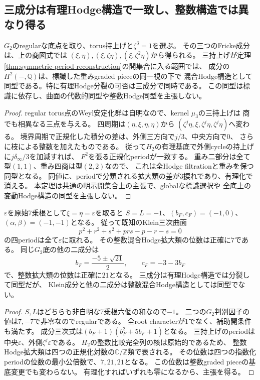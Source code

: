 \subsection{三成分は有理Hodge構造で一致し、整数構造では異なり得る}
\begin{theorem}[三乗根の差と有理混合Hodge構造]
\label{thm:G2-companion-rational-Hodge}
$G_2$のregularな底点を取り、torus持上げと$\zeta^3=1$を選ぶ。
その三つのFricke成分は、上の商図式では
$(\xi,\eta),(\xi,\zeta\eta),(\xi,\zeta^2\eta)$から得られる。
三持上げが定理\ref{thm:symmetric-period-reconstruction}の開集合に入る範囲では、
成分の$H^2(-,\mathbb Q)$は、標識した重みgraded pieceの同一視の下で
混合Hodge構造として同型である。特に有理Hodge分裂の可否は三成分で同時である。
この同型は標識に依存し、曲面の代数的同型や整数Hodge同型を主張しない。
\end{theorem}
\begin{proof}
regular torus点のWeyl安定化群は自明なので、kernel $\mu_3$の三持上げは
商でも相異なる三点を与える。
四周期は$(\eta,\xi,\eta,\eta)$から
$(\zeta^j\eta,\xi,\zeta^j\eta,\zeta^j\eta)$へ変わる。
境界周期で正規化した積分の差は、外側三方向で$j/3$、中央方向で$0$、
さらに枝による整数を加えたものである。
従って$H_2$の有理基底で外側cycleの持上げに$j\delta_\infty/3$を加減すれば、
$F^2$を張る正規化periodが一致する。
重み二部分は全て型$(1,1)$、重み四商は型$(2,2)$なので、
これは全Hodge filtrationと重みを保つ同型となる。
同値に、periodで分類される拡大類の差が3捩れであり、有理化で消える。
本定理は共通の明示開集合上の主張で、globalな標識選択や
全底上の変動Hodge構造の同型を主張しない。
\end{proof}

\begin{corollary}
\label{cor:Klein-seven-twentyone-Hodge}
$\varepsilon$を原始7乗根として$\xi=\eta=\varepsilon$を取ると
$S=L=-1$、$(b_F,c_F)=(-1,0)$、$(\alpha,\beta)=(-1,-1)$となる。
従って既知のKlein三次曲面
\[
 p^2+r^2+s^2+prs-p-r-s=0
\]
の四periodは全て$\varepsilon$に取れる。
その整数混合Hodge拡大類の位数は正確に$7$である。
同じ$G_2$底の他の二成分は
\[
 b_F=\frac{-5\pm\sqrt{21}}2,\qquad c_F=-3-3b_F
\]
で、整数拡大類の位数は正確に$21$となる。
三成分は有理Hodge構造では分裂して同型だが、
Klein成分と他の二成分は整数混合Hodge構造としては同型でない。
\end{corollary}
\begin{proof}
$S,L$はどちらも非自明な7乗根六個の和なので$-1$。
二つの$G_2$判別因子の値は$7,-7$で非零なのでregularである。
全root characterが1でなく、補助開条件も満たす。
成分三次式は$(b_F+1)(b_F^2+5b_F+1)$となる。
三持上げのperiodは中央$\varepsilon$、外側$\zeta^j\varepsilon$である。
$H_2$の整数比較完全列の核は原始的であるため、
整数Hodge拡大類は四つの正規化対数の$\mathbb C/\mathbb Z$類で表される。
その位数は四つの指数化periodの位数の最小公倍数で、$7,21,21$となる。
この位数は整数graded pieceの基底変更でも変わらない。
有理化すればいずれも零になるから、主張を得る。
\end{proof}


